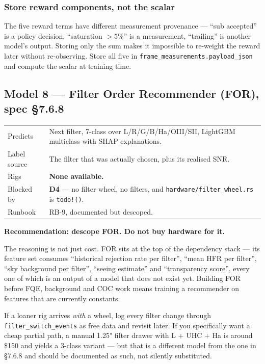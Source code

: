 \documentclass[11pt]{article}
\newcommand{\co}[1]{\texttt{\small #1}}
\begin{document}
\subsubsection*{Store reward components, not the scalar}

The five reward terms have different measurement provenance --- ``sub accepted''
is a policy decision, ``saturation $>5\%$'' is a measurement, ``trailing'' is
another model's output. Storing only the sum makes it impossible to re-weight the
reward later without re-observing. Store all five in
\co{frame\_measurements.payload\_json} and compute the scalar at training time.

\subsection{Model 8 --- Filter Order Recommender (FOR), spec \S7.6.8}\label{m:for}

\begin{center}
\small
\begin{tabular}{@{}p{}p{}@{}}
\toprule
Predicts & Next filter, 7-class over L/R/G/B/Ha/OIII/SII, LightGBM multiclass with SHAP explanations. \\
Label source & The filter that was actually chosen, plus its realised SNR. \\
Rigs & \textbf{None available.} \\
Blocked by & \textbf{D4} --- no filter wheel, no filters, and \co{hardware/filter\_wheel.rs} is \co{todo!()}. \\
Runbook & RB-9, documented but descoped. \\
\bottomrule
\end{tabular}
\end{center}

\begin{keybox}
\textbf{Recommendation: descope FOR. Do not buy hardware for it.}

The reasoning is not just cost. FOR sits at the top of the dependency stack ---
its feature set consumes ``historical rejection rate per filter'', ``mean HFR per
filter'', ``sky background per filter'', ``seeing estimate'' and ``transparency
score'', every one of which is an output of a model that does not exist yet.
Building FOR before FQE, background and COC work means training a recommender on
features that are currently constants.

If a loaner rig arrives \emph{with} a wheel, log every filter change through
\co{filter\_switch\_events} as free data and revisit later. If you specifically
want a cheap partial path, a manual 1.25" filter drawer with L + UHC + Ha is
around \$150 and yields a 3-class variant --- but that is a different model from
the one in \S7.6.8 and should be documented as such, not silently substituted.
\end{keybox}
\end{document}

